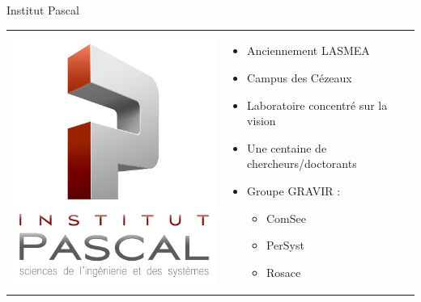 \documentclass{beamer}
\begin{document}
\begin{frame}{Institut Pascal}
  \begin{tabular}{l l}
    \begin{minipage}{0.3\linewidth}
      \includegraphics[width=\linewidth]{images/logo-IP.jpg}
    \end{minipage}
    &
    \begin{minipage}{0.7\linewidth}
      \begin{itemize}
      \item Anciennement LASMEA
      \item Campus des Cézeaux
      \item Laboratoire concentré sur la vision
      \item Une centaine de chercheurs/doctorants
      \item Groupe GRAVIR : %
        \begin{itemize}
        \item ComSee %
        \item PerSyst %
        \item Rosace %
        \end{itemize}  
      \end{itemize}
    \end{minipage}
  \end{tabular}
\end{frame}
\end{document}
